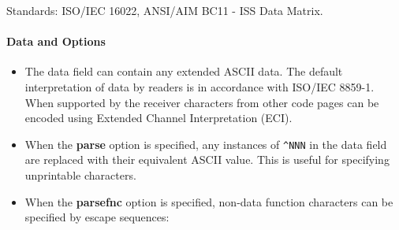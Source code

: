 Standards: ISO/IEC 16022, ANSI/AIM BC11 - ISS Data Matrix.

\hypertarget{data-and-options-9}{%
\paragraph{Data and Options}\label{data-and-options-9}}

\begin{itemize}
\tightlist
\item
  The data field can contain any extended ASCII data. The default
  interpretation of data by readers is in accordance with ISO/IEC
  8859-1. When supported by the receiver characters from other code
  pages can be encoded using Extended Channel Interpretation (ECI).
\item
  When the \textbf{parse} option is specified, any instances of
  \texttt{\^{}NNN} in the data field are replaced with their equivalent
  ASCII value. This is useful for specifying unprintable characters.
\item
  When the \textbf{parsefnc} option is specified, non-data function
  characters can be specified by escape sequences:


\end{itemize}
